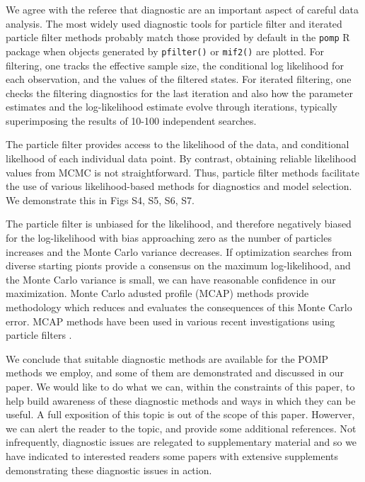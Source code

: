 \documentclass[11pt]{article}
\newcommand\code[1]{\texttt{#1}}
\begin{document}
We agree with the referee that diagnostic are an important aspect of careful data analysis.
The most widely used diagnostic tools for particle filter and iterated particle filter methods probably match those provided by default in the \code{pomp} R package \cite{king16} when objects generated by \code{pfilter()} or \code{mif2()} are plotted.
For filtering, one tracks the effective sample size, the conditional log likelihood for each observation, and the values of the filtered states.
For iterated filtering, one checks the filtering diagnostics for the last iteration and also how the parameter estimates and the log-likelihood estimate evolve through iterations, typically superimposing the results of 10-100 independent searches.

The particle filter provides access to the likelihood of the data, and conditional likelhood of each individual data point.
By contrast, obtaining reliable likelihood values from MCMC is not straightforward.
Thus, particle filter methods facilitate the use of various likelihood-based methods for diagnostics and model selection.
We demonstrate this in Figs S4, S5, S6, S7.

The particle filter is unbiased for the likelihood, and therefore negatively biased for the log-likelihood with bias approaching zero as the number of particles increases and the Monte Carlo variance decreases.
If optimization searches from diverse starting pionts provide a consensus on the maximum log-likelihood, and the Monte Carlo variance is small, we can have reasonable confidence in our maximization.
Monte Carlo adusted profile (MCAP) methods \cite{ionides17,ning21} provide methodology which reduces and evaluates the consequences of this Monte Carlo error.
MCAP methods have been used in various recent investigations using particle filters .

We conclude that suitable diagnostic methods are available for the POMP methods we employ, and some of them are demonstrated and discussed in our paper.
We would like to do what we can, within the constraints of this paper, to help build awareness of these diagnostic methods and ways in which they can be useful.
A full exposition of this topic is out of the scope of this paper.
Howerver, we can alert the reader to the topic, and provide some additional references.
Not infrequently, diagnostic issues are relegated to supplementary material and so we have indicated to interested readers some papers with extensive supplements demonstrating these diagnostic issues in action.
\TODO{}
\end{document}
